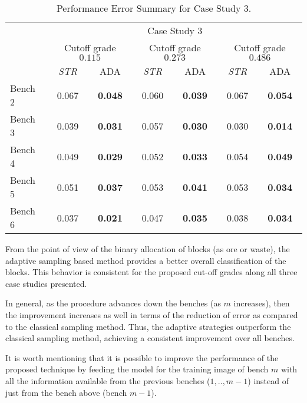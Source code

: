 \begin{table}
	\caption{Performance Error Summary for Case Study 3.}
	\label{tab:performances_global_classification_cs3_PII}
	\begin{center}
		\begin{tabular}{lcccccc}\toprule
			& \multicolumn{6}{c}{Case Study 3} \\
			& \multicolumn{2}{c}{Cutoff grade $0.115$}& \multicolumn{2}{c}{Cutoff grade $0.273$} & \multicolumn{2}{c}{Cutoff grade $0.486$} \\
			& {\emph{STR}} & {ADA} & {\emph{STR}} & {ADA} & {\emph{STR}} & {ADA}\\\midrule
			Bench 2 & 0.067   & \textbf{0.048} & 0.060  & \textbf{0.039} & 0.067  & \textbf{0.054} \\
			Bench 3 & 0.039 & \textbf{0.031} & 0.057 & \textbf{0.030} & 0.030 & \textbf{0.014} \\
			Bench 4 & 0.049 & \textbf{0.029} & 0.052 & \textbf{0.033} & 0.054 & \textbf{0.049} \\
			Bench 5  & 0.051 & \textbf{0.037}  & 0.053  & \textbf{0.041} & 0.053  & \textbf{0.034}\\
			Bench 6  & 0.037 & \textbf{0.021} & 0.047  & \textbf{0.035} & 0.038  & \textbf{0.034} \\
			\bottomrule
		\end{tabular}
	\end{center}
\end{table}

From the point of view of the binary allocation of blocks (as ore or waste), the adaptive sampling based method provides a better overall classification of the blocks. This behavior is consistent for the proposed cut-off grades along all three case studies presented. %

In general,  as the procedure advances down the benches (as $m$ increases), then the improvement increases as well in terms of the reduction of error as compared to the classical sampling method. Thus, the adaptive strategies outperform the classical sampling method, achieving a consistent improvement over all benches.

It is worth mentioning that it is possible to improve the performance of the proposed technique by feeding the model for the training image of bench $m$ with all the information available from the previous benches ($1, .. ,m-1$) instead of just from the bench above (bench $m - 1$).



